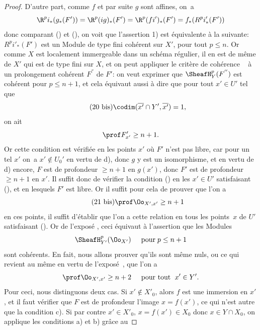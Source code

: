 \begin{proof}
D'autre part, comme $f$ et par suite $g$ sont affines, on~a
\steco
\begin{equation} \label{eq:XII.20} {}\R^pi_\ast(g_\ast(F')) = \R^p(ig)_\ast(F') = \R^p(fi')_\ast(F') = f_\ast(R^pi'_\ast(F'))
\end{equation}
donc comparant () et (), on voit que l'assertion 1\sisi{${}^\circ$}{}) est \'equivalente \`a la suivante: $R^pi'_\ast(F')$ est un Module de type fini \ie coh\'erent sur $X'$, pour tout $p\leq n$. Or comme $X$ est localement immergeable dans un sch\'ema r\'egulier, il en est de m\^eme de $X'$ qui est de type fini sur $X$, et on peut appliquer le crit\`ere de coh\'erence ~ \`a un prolongement coh\'erent $F^{''}$ de $F'$: on veut exprimer que $\SheafH^p_Y(F^{''})$ est coh\'erent pour $p\leq n+1$, et cela \'equivaut aussi \`a dire que pour tout $x'\in U'$ tel que
\begin{equation*} \label{eq:XII.20bis} \tag{20 bis} {}\codim (\overline{x'}\cap Y', \overline{x'})=1,
\end{equation*}
on ait
\steco
\begin{equation} \label{eq:XII.21} {} \prof F'_{x'}\geq n+1.
\end{equation}
Or cette condition est v\'erifi\'ee en les points $x'$ o\`u $F'$ n'est pas libre, car pour un tel $x'$ on~a $x'\notin U_0'$ en vertu de d), donc $g$ y est un isomorphisme, et en vertu de d) encore, $F$ est de profondeur $\geq n+1$ en $g(x')$, donc $F'$ est de profondeur $\geq n+1$ en $x'$. Il suffit donc de v\'erifier la condition () en les $x'\in U'$ satisfaisant (), et en lesquels $F'$ est libre. Or il suffit pour cela de prouver que l'on a\pageoriginale
\begin{equation*} \label{eq:XII.21bis} \tag{21 bis}
\prof \Oo_{X', x'}\geq n+1
\end{equation*}
\enlargethispage{\baselineskip}%
en ces points, \afortiori il suffit d'\'etablir que l'on a cette relation en tous les points~$x$ de $U'$ satisfaisant (). Or de l'expos\'e , ceci \'equivaut \`a l'assertion que les Modules
\[
\SheafH^p_{Y'}(\Oo_{X'}) \hspace{5mm} \text{pour} \; p\leq n+1
\]
sont coh\'erents. En fait, nous allons prouver qu'ils sont m\^eme nuls, ou ce qui revient au m\^eme en vertu de l'expos\'e~, que l'on a
\steco
\begin{equation} \label{eq:XII.22} {} \prof \Oo_{X', x'}\geq n+2 \hspace{5mm} \text{pour tout }\; x'\in Y'.
\end{equation}
Pour ceci, nous distinguons deux cas. Si $x'\notin X'_0$, alors $f$ est une immersion en $x'$, et il faut v\'erifier que $F$ est de profondeur  l'image $x=f(x')$, ce qui n'est autre que la condition c). Si par contre $x'\in X'_0$, \ie $x=f(x')\in X_0$ donc $x\in Y\cap X_0$, on applique les conditions a) et b) gr\^ace au


\end{proof}

